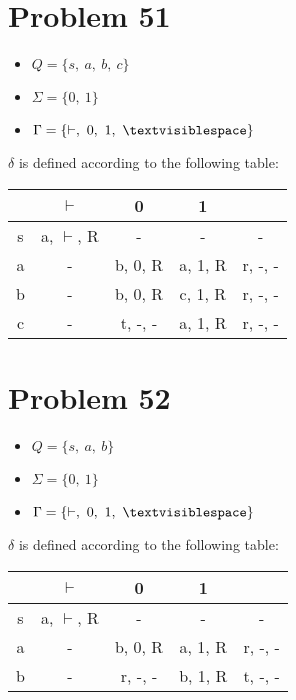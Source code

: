 \documentclass[11pt]{article}
\begin{document}
\section*{Problem 51}

\begin{itemize}
	\item $Q = \{ s,\ a,\ b,\ c \}$
	\item $\Sigma = \{0,\ 1\}$
	\item $\Gamma = \{ \vdash,\ 0,\ 1,\ \textvisiblespace\}$
\end{itemize}

$\delta$ is defined according to the following table:


\begin{tabular}{ c | c | c | c | c }
			& $\vdash$				& 0 					& 1				& \textvisiblespace \\
		\hline
		s	& a, $\vdash$, R		& -					& -				& - \\
		a	& -							& b, 0, R			& a, 1, R		& r, -, - \\
		b	& -							& b, 0, R			& c, 1, R		& r, -, - \\
		c	& -							& t, -, -				& a, 1, R		& r, -, -
\end{tabular}


\section*{Problem 52}

\begin{itemize}
	\item $Q = \{ s,\ a,\ b \}$
	\item $\Sigma = \{0,\ 1\}$
	\item $\Gamma = \{ \vdash,\ 0,\ 1,\ \textvisiblespace\}$
\end{itemize}

$\delta$ is defined according to the following table:


\begin{tabular}{ c | c | c | c | c }
			& $\vdash$				& 0 					& 1				& \textvisiblespace \\
		\hline
		s	& a, $\vdash$, R		& -					& -				& - \\
		a	& -							& b, 0, R			& a, 1, R		& r, -, - \\
		b	& -							& r, -, -				& b, 1, R		& t, -, - \\
\end{tabular}
\end{document}
